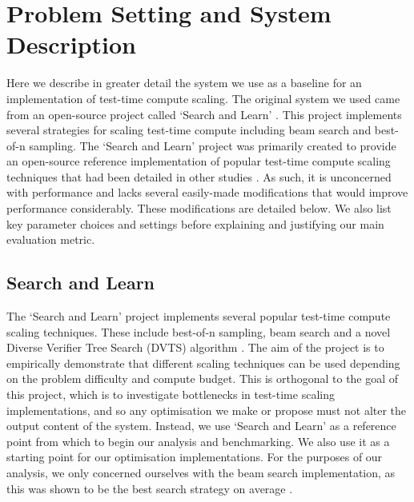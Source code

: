 \documentclass[12pt,twoside]{report}
\begin{document}
\chapter{Problem Setting and System Description}
\begin{comment}
  - I think this is where I explain the original search and learn benchmark
  - I should also detail all the optimisations done by marcel + otto for posterity (this also kind of makes it sound like I might have done some work there?)
  - I also need to list details of the model + config choices as well
\end{comment}
Here we describe in greater detail the system we use as a baseline for an implementation of test-time compute scaling. 
The original system we used came from an open-source project called `Search and Learn' \cite{beeching2024scalingtesttimecompute}.
This project implements several strategies for scaling test-time compute including beam search and best-of-n sampling. 
The `Search and Learn' project was primarily created to provide an open-source reference implementation of popular test-time compute scaling techniques that had been detailed in other studies \cite{snell2024scaling}.
As such, it is unconcerned with performance and lacks several easily-made modifications that would improve performance considerably.
These modifications are detailed below. 
We also list key parameter choices and settings before explaining and justifying our main evaluation metric.

\section{Search and Learn}
The `Search and Learn' project implements several popular test-time compute scaling techniques. 
These include best-of-n sampling, beam search and a novel Diverse Verifier Tree Search (DVTS) algorithm \cite{beeching2024scalingtesttimecompute}.
The aim of the project is to empirically demonstrate that different scaling techniques can be used depending on the problem difficulty and compute budget.
This is orthogonal to the goal of this project, which is to investigate bottlenecks in test-time scaling implementations, and so any optimisation we make or propose must not alter the output content of the system. 
Instead, we use `Search and Learn' as a reference point from which to begin our analysis and benchmarking.
We also use it as a starting point for our optimisation implementations.
For the purposes of our analysis, we only concerned ourselves with the beam search implementation, as this was shown to be the best search strategy on average \cite{beeching2024scalingtesttimecompute}.
\end{document}
